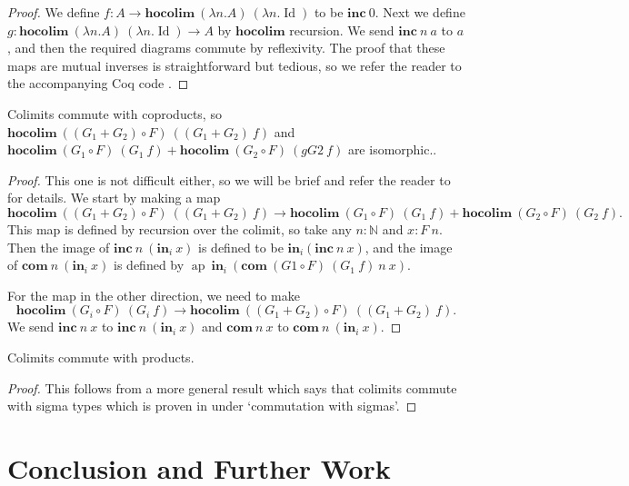\documentclass[a4paper,UKenglish]{lipics-v2016}
\newcommand{\Boperator}[1]{\mathrm{\mathbf{#1}}}
\newcommand{\inn}{\Boperator{in}}
\newcommand{\ap}[0]{\operatorname{ap}}
\newcommand{\hocolim}[0]{\Boperator{hocolim}}
\newcommand{\inc}[0]{\Boperator{inc}}
\newcommand{\com}[0]{\Boperator{com}}
\begin{document}
\begin{proof}
We define $f : A \rightarrow \hocolim \> (\lambda n . A) \> (\lambda n . \operatorname{Id})$ to be $\inc \> 0$.
Next we define $g : \hocolim \> (\lambda n . A) \> (\lambda n . \operatorname{Id}) \rightarrow A$ by $\hocolim$ recursion.
We send $\inc \> n \> a$ to $a$, and then the required diagrams commute by reflexivity.
The proof that these maps are mutual inverses is straightforward but tedious, so we refer the reader to the accompanying Coq code \cite{CoqImpl}.
\end{proof}

\begin{lemma}
\label{lem:colimsum}
Colimits commute with coproducts, so $\hocolim \> ((G_1 + G_2) \circ F) \> ((G_1 + G_2) \> f)$ and $\hocolim \> (G_1 \circ F) \> (G_1 \> f) + \hocolim \> (G_2 \circ F) \> (gG2 \> f)$ are isomorphic.. 
\end{lemma}

\begin{proof}
This one is not difficult either, so we will be brief and refer the reader to \cite{CoqImpl} for details.
We start by making a map 
\[
\hocolim \> ((G_1 + G_2) \circ F) \> ((G_1 + G_2) \> f) \rightarrow \hocolim \> (G_1 \circ F) \> (G_1 \> f) + \hocolim \> (G_2 \circ F) \> (G_2 \> f).
\]
This map is defined by recursion over the colimit, so take any $n : \mathbb{N}$ and $x : F \> n$.
Then the image of $\inc \> n \> (\inn_i \> x)$ is defined to be $\inn_i (\inc \> n \> x)$, and the image of $\com \> n \> (\inn_i \> x)$ is defined by
$\ap \> \inn_i \> (\com \> (G1 \circ F) \> (G_1 \> f) \> n \> x)$.

For the map in the other direction, we need to make 
\[
\hocolim \> (G_i \circ F) \> (G_i \> f) \rightarrow \hocolim \> ((G_1 + G_2) \circ F) \> ((G_1 + G_2) \> f).
\]
We send $\inc \> n \> x$ to $\inc \> n \> (\inn_i \> x)$ and $\com \> n \> x$ to $\com \> n \> (\inn_i \> x)$.
\end{proof}

\begin{lemma}
\label{lem:colimprod}
Colimits commute with products.
\end{lemma}

\begin{proof}
This follows from a more general result which says that colimits commute with sigma types which is proven in \cite{boulier2016} under `commutation with sigmas'.
\end{proof}

\section{Conclusion and Further Work}



\nocite{*}





\end{document}
